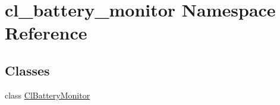 \hypertarget{namespacecl__battery__monitor}{}\section{cl\+\_\+battery\+\_\+monitor Namespace Reference}
\label{namespacecl__battery__monitor}
\subsection*{Classes}
\begin{DoxyCompactItemize}
\item 
class \hyperlink{classcl__battery__monitor_1_1ClBatteryMonitor}{Cl\+Battery\+Monitor}
\end{DoxyCompactItemize}
